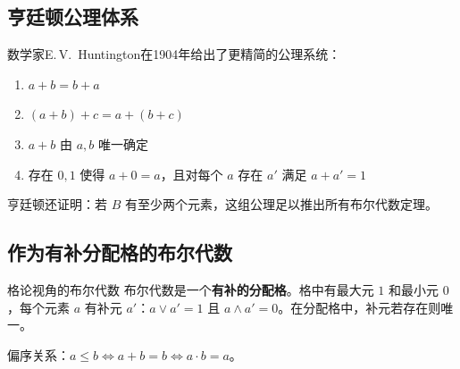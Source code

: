 \subsection{亨廷顿公理体系}

数学家E.\,V.~Huntington在1904年给出了更精简的公理系统：

\begin{enumerate}[label=\textbf{H\arabic*}:,leftmargin=*]
    \item \(a+b=b+a\)
    \item \((a+b)+c=a+(b+c)\)
    \item \(a+b\) 由 \(a,b\) 唯一确定
    \item 存在 \(0,1\) 使得 \(a+0=a\)，且对每个 \(a\) 存在 \(a'\) 满足 \(a+a'=1\)
\end{enumerate}

亨廷顿还证明：若 \(B\) 有至少两个元素，这组公理足以推出所有布尔代数定理。

\subsection{作为有补分配格的布尔代数}

\begin{mydefinition}{格论视角的布尔代数}
布尔代数是一个\textbf{有补的分配格}。格中有最大元 \(1\) 和最小元 \(0\)，每个元素 \(a\) 有补元 \(a'\)：\(a\vee a'=1\) 且 \(a\wedge a'=0\)。在分配格中，补元若存在则唯一。
\end{mydefinition}

偏序关系：\(a \leq b \iff a+b=b \iff a\cdot b = a\)。

